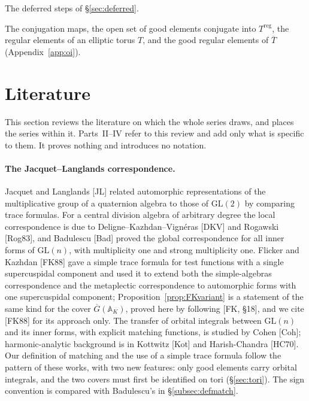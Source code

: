 \documentclass[12pt]{article}
\newcommand{\ov}[1]{\overline{#1}}
\newcommand{\A}{\mathbb{A}}
\newcommand{\reg}{\mathrm{reg}}
\newcommand{\GL}{\mathrm{GL}}
\newcommand{\Gb}{\ov{G}}
\newcommand{\Tb}{\ov{T}}
\theoremstyle{plain}
\theoremstyle{definition}
\begin{document}
\begin{description}[style=nextline,leftmargin=1.5em]
\item[(D1)--(D4)] The deferred steps of \S\ref{sec:deferred}.
\item[$\Psi$, $\tilde\Psi$, $\Gb_T$, $T^{\reg}$, $\Tb^{g,\reg}$] The conjugation maps, the open set of good elements conjugate into $T^{\reg}$, the regular elements of an elliptic torus $T$, and the good regular elements of $\Tb$ (Appendix~\ref{app:oi}).
\end{description}

\section{Literature}\label{sec:lit}
This section reviews the literature on which the whole series draws, and places the series within it. Parts~II--IV refer to this review and add only what is specific to them. It proves nothing and introduces no notation.

\paragraph{The Jacquet--Langlands correspondence.} Jacquet and Langlands [JL] related automorphic representations of the multiplicative group of a quaternion algebra to those of $\GL(2)$ by comparing trace formulas. For a central division algebra of arbitrary degree the local correspondence is due to Deligne--Kazhdan--Vign\'eras [DKV] and Rogawski [Rog83], and Badulescu [Bad] proved the global correspondence for all inner forms of $\GL(n)$, with multiplicity one and strong multiplicity one. Flicker and Kazhdan [FK88] gave a simple trace formula for test functions with a single supercuspidal component and used it to extend both the simple-algebras correspondence and the metaplectic correspondence to automorphic forms with one supercuspidal component; Proposition~\ref{prop:FKvariant} is a statement of the same kind for the cover $\Gb(\A_K)$, proved here by following [FK, \S18], and we cite [FK88] for its approach only. The transfer of orbital integrals between $\GL(n)$ and its inner forms, with explicit matching functions, is studied by Cohen [Coh]; harmonic-analytic background is in Kottwitz [Kot] and Harish-Chandra [HC70]. Our definition of matching and the use of a simple trace formula follow the pattern of these works, with two new features: only good elements carry orbital integrals, and the two covers must first be identified on tori (\S\ref{sec:tori}). The sign convention is compared with Badulescu's in \S\ref{subsec:defmatch}.
\end{document}
